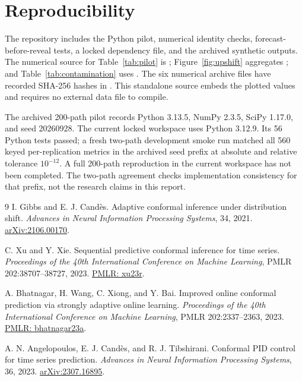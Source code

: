 \documentclass[11pt]{article}
\begin{document}
\section{Reproducibility}
The repository includes the Python pilot, numerical identity checks,
forecast-before-reveal tests, a locked dependency file, and the archived
synthetic outputs. The numerical source for Table~\ref{tab:pilot} is
;
Figure~\ref{fig:upshift} aggregates
; and
Table~\ref{tab:contamination} uses
.
The six numerical archive files have recorded SHA-256 hashes in
. This standalone source
embeds the plotted values and requires no external data file to compile.

The archived 200-path pilot records Python 3.13.5, NumPy 2.3.5, SciPy 1.17.0,
and seed 20260928. The current locked workspace uses Python 3.12.9. Its 56
Python tests passed; a fresh two-path development smoke run matched all 560
keyed per-replication metrics in the archived seed prefix at absolute and
relative tolerance $10^{-12}$. A full 200-path reproduction in the current
workspace has not been completed. The two-path agreement checks implementation
consistency for that prefix, not the research claims in this report.

\begin{thebibliography}{9}
I. Gibbs and E. J. Cand\`es.
Adaptive conformal inference under distribution shift.
\emph{Advances in Neural Information Processing Systems}, 34, 2021.
\href{https://arxiv.org/abs/2106.00170}{arXiv:2106.00170}.

C. Xu and Y. Xie.
Sequential predictive conformal inference for time series.
\emph{Proceedings of the 40th International Conference on Machine Learning},
PMLR 202:38707--38727, 2023.
\href{https://proceedings.mlr.press/v202/xu23r.html}{PMLR: xu23r}.

A. Bhatnagar, H. Wang, C. Xiong, and Y. Bai.
Improved online conformal prediction via strongly adaptive online learning.
\emph{Proceedings of the 40th International Conference on Machine Learning},
PMLR 202:2337--2363, 2023.
\href{https://proceedings.mlr.press/v202/bhatnagar23a.html}{PMLR: bhatnagar23a}.

A. N. Angelopoulos, E. J. Cand\`es, and R. J. Tibshirani.
Conformal PID control for time series prediction.
\emph{Advances in Neural Information Processing Systems}, 36, 2023.
\href{https://arxiv.org/abs/2307.16895}{arXiv:2307.16895}.
\end{thebibliography}
\end{document}
